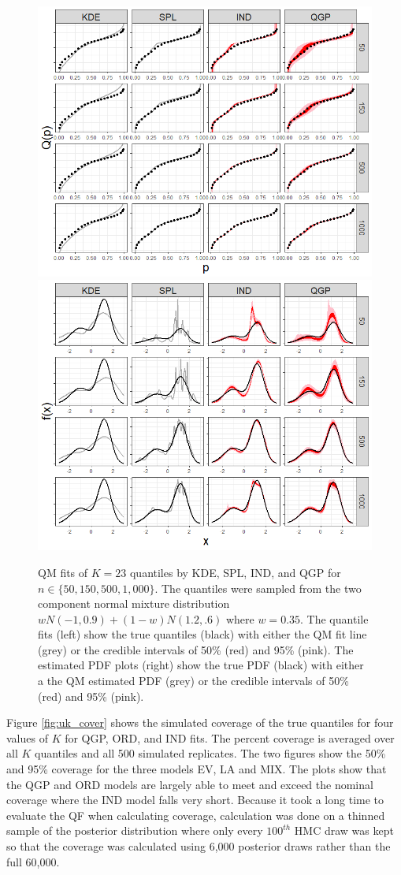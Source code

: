 \documentclass[preprint,12pt,authoryear]{elsarticle}
\begin{document}
\begin{figure}[hbt!]
\centering
  \centering
  \includegraphics[width=.49\linewidth]{Images/quants_gmix.png}
  \centering
  \includegraphics[width=.49\linewidth]{Images/dens_gmix.png}
\caption{QM fits of $K=23$ quantiles by KDE, SPL, IND, and QGP for $n \in \{50, 150, 500, 1{,}000\}$. The quantiles were sampled from the two component normal mixture distribution $w N(-1, 0.9) + (1-w)N(1.2, .6)$ where $w = 0.35$. The quantile fits (left) show the true quantiles (black) with either the QM fit line (grey) or the credible intervals of 50\% (red) and 95\% (pink). 
The estimated PDF plots (right) show the true PDF (black) with either a the QM estimated PDF (grey) or the credible intervals of 50\% (red) and 95\% (pink). }
\label{fig:gmix_fits}
\end{figure}



Figure \ref{fig:uk_cover} shows the simulated coverage of the true quantiles for four values of $K$ for QGP, ORD, and IND fits. The percent coverage is averaged over all $K$ quantiles and all 500 simulated replicates. The two figures show the 50\% and 95\% coverage for the three models EV, LA and MIX. The plots show that the QGP and ORD models are largely able to meet and exceed the nominal coverage where the IND model falls very short. Because it took a long time to evaluate the QF when calculating coverage, calculation was done on a thinned sample of the posterior distribution where only every $100^{th}$ HMC draw was kept so that the coverage was calculated using 6,000 posterior draws rather than the full 60,000.
\end{document}
